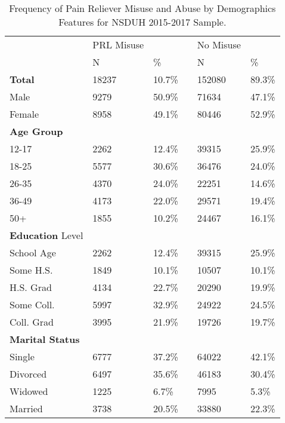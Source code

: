 \documentclass[sigconf]{acmart}
\begin{document}
\begin{table}
  \caption{Frequency of Pain Reliever Misuse and Abuse
  by Demographics Features for NSDUH 2015-2017 Sample.}
  \label{tab:freq}
  \begin{tabular}{llllll}
    \toprule
              & PRL Misuse & & & No Misuse & \\
              & N & \% &  & N & \% \\
    \midrule
    \textbf{Total}     & 18237 & 10.7\% & & 152080 & 89.3\% \\
    Male      & 9279 & 50.9\% & & 71634 & 47.1\%  \\
    Female    & 8958 & 49.1\% & & 80446 & 52.9\%  \\
    \midrule
    \textbf{Age Group} &  &  &  &  & \\
    12-17     & 2262 & 12.4\% & & 39315 & 25.9\% \\
    18-25     & 5577 & 30.6\% & & 36476 & 24.0\% \\
    26-35     & 4370 & 24.0\% & & 22251 & 14.6\% \\
    36-49     & 4173 & 22.0\% & & 29571 & 19.4\% \\
    50+       & 1855 & 10.2\% & & 24467 & 16.1\% \\
    \midrule
    \textbf{Education} Level &  &  &  &  & \\
    School Age & 2262 & 12.4\% & & 39315 & 25.9\% \\
    Some H.S.  & 1849 & 10.1\% & & 10507 & 10.1\% \\
    H.S. Grad  & 4134 & 22.7\% & & 20290 & 19.9\% \\
    Some Coll. & 5997 & 32.9\% & & 24922 & 24.5\% \\
    Coll. Grad & 3995 & 21.9\% & & 19726 & 19.7\% \\
    \midrule
    \textbf{Marital Status} &  &  &  &  & \\
    Single    & 6777 & 37.2\% & & 64022 & 42.1\% \\
    Divorced  & 6497 & 35.6\% & & 46183 & 30.4\% \\
    Widowed   & 1225 &  6.7\% & &  7995 &  5.3\% \\
    Married   & 3738 & 20.5\% & & 33880 & 22.3\% \\
    
    \bottomrule
  \end{tabular}
\end{table}

\end{document}
